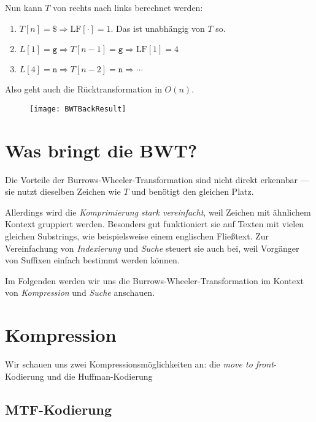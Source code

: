 \begin{minipage}{.8\textwidth}
  Nun kann \( T \) von rechts nach links berechnet werden:
  \begin{enumerate}
    \item \( T[n] = \texttt{\$} \Rightarrow \text{LF}[\cdot] = 1 \). Das ist unabhängig von \( T \) so.
    \item \( L[1] = \texttt{g} \Rightarrow T[n-1] = \texttt{g} \Rightarrow \text{LF}[1] = 4 \)
    \item \( L[4] = \texttt{n} \Rightarrow T[n-2] = \texttt{n} \Rightarrow \cdots \)
  \end{enumerate}
  Also geht auch die Rücktransformation in \( O(n) \).
\end{minipage}
\hfill
\begin{minipage}{.15\textwidth}
  \begin{figure}[H]
    \texttt{[image: BWTBackResult]}
  \end{figure}
\end{minipage}

\section{Was bringt die BWT?}

Die Vorteile der Burrows-Wheeler-Transformation sind nicht direkt erkennbar --- sie nutzt dieselben Zeichen wie \( T \) und benötigt den gleichen Platz.

Allerdings wird die \emph{Komprimierung stark vereinfacht}, weil Zeichen mit ähnlichem Kontext gruppiert werden. Besonders gut funktioniert sie auf Texten mit vielen gleichen Substrings, wie beispielsweise einem englischen Fließtext. Zur Vereinfachung von \emph{Indexierung} und \emph{Suche} steuert sie auch bei, weil Vorgänger von Suffixen einfach bestimmt werden können.

Im Folgenden werden wir uns die Burrows-Wheeler-Transformation im Kontext von \emph{Kompression} und \emph{Suche} anschauen.

\section{Kompression}

Wir schauen uns zwei Kompressionsmöglichkeiten an: die \emph{move to front}-Kodierung und die Huffman-Kodierung

\subsection{MTF-Kodierung}

